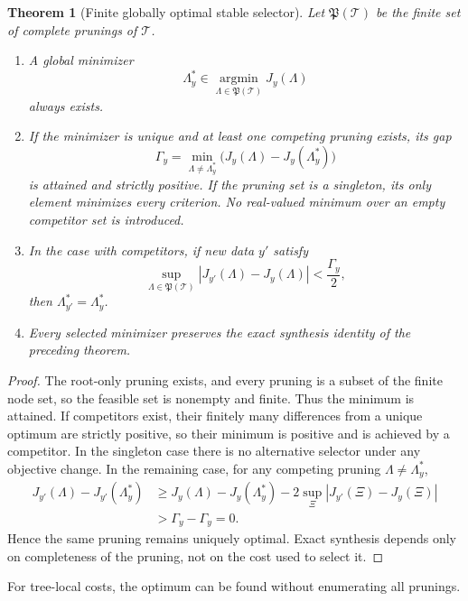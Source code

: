 \documentclass[11pt,letterpaper]{article}
\newtheorem{theorem}{Theorem}[section]
\theoremstyle{plain}
\theoremstyle{plain}
\theoremstyle{plain}
\theoremstyle{definition}
\theoremstyle{definition}
\theoremstyle{definition}
\theoremstyle{definition}
\theoremstyle{remark}
\theoremstyle{remark}
\theoremstyle{remark}
\theoremstyle{remark}
\begin{document}
\begin{theorem}[Finite globally optimal stable selector]\label{result:14}
Let $\mathfrak P(\mathcal T)$ be the finite set of complete prunings of $\mathcal T$.

\begin{enumerate}[label=(\roman*)]
\item A global minimizer
\[
\Lambda_y^*\in\operatorname*{argmin}_{\Lambda\in\mathfrak P(\mathcal T)}J_y(\Lambda)
\]
always exists.
\item If the minimizer is unique and at least one competing pruning exists, its gap
\[
\Gamma_y
=
\min_{\Lambda\ne\Lambda_y^*}
\bigl(J_y(\Lambda)-J_y(\Lambda_y^*)\bigr)
\]
is attained and strictly positive. If the pruning set is a singleton, its only element minimizes every criterion. No real-valued minimum over an empty competitor set is introduced.
\item In the case with competitors, if new data $y'$ satisfy
\[
\sup_{\Lambda\in\mathfrak P(\mathcal T)}
|J_{y'}(\Lambda)-J_y(\Lambda)|
<\frac{\Gamma_y}{2},
\]
then $\Lambda_{y'}^*=\Lambda_y^*$.
\item Every selected minimizer preserves the exact synthesis identity of the preceding theorem.
\end{enumerate}
\end{theorem}

\begin{proof}
The root-only pruning exists, and every pruning is a subset of the finite node set, so the feasible set is nonempty and finite. Thus the minimum is attained. If competitors exist, their finitely many differences from a unique optimum are strictly positive, so their minimum is positive and is achieved by a competitor. In the singleton case there is no alternative selector under any objective change. In the remaining case, for any competing pruning $\Lambda\ne\Lambda_y^*$,
\[
\begin{aligned}
J_{y'}(\Lambda)-J_{y'}(\Lambda_y^*)
&\ge
J_y(\Lambda)-J_y(\Lambda_y^*)
-2\sup_{\Xi}|J_{y'}(\Xi)-J_y(\Xi)|\\
&>\Gamma_y-\Gamma_y=0.
\end{aligned}
\]
Hence the same pruning remains uniquely optimal.  Exact synthesis depends only on completeness of the pruning, not on the cost used to select it.
\end{proof}

For tree-local costs, the optimum can be found without enumerating all prunings.
\end{document}
